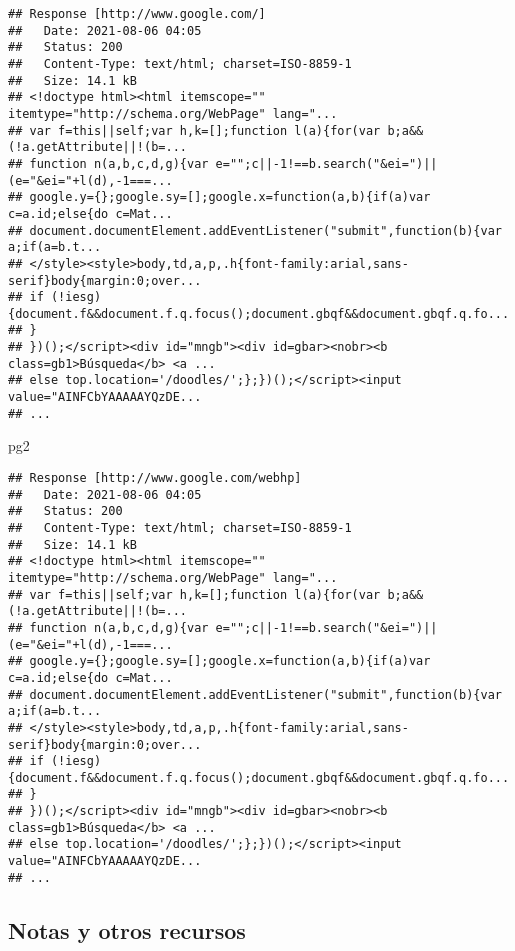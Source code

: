 \documentclass[
]{article}
\newenvironment{Shaded}{\begin{snugshade}}{\end{snugshade}}
\newcommand{\NormalTok}[1]{#1}
\begin{document}
\begin{verbatim}
## Response [http://www.google.com/]
##   Date: 2021-08-06 04:05
##   Status: 200
##   Content-Type: text/html; charset=ISO-8859-1
##   Size: 14.1 kB
## <!doctype html><html itemscope="" itemtype="http://schema.org/WebPage" lang="...
## var f=this||self;var h,k=[];function l(a){for(var b;a&&(!a.getAttribute||!(b=...
## function n(a,b,c,d,g){var e="";c||-1!==b.search("&ei=")||(e="&ei="+l(d),-1===...
## google.y={};google.sy=[];google.x=function(a,b){if(a)var c=a.id;else{do c=Mat...
## document.documentElement.addEventListener("submit",function(b){var a;if(a=b.t...
## </style><style>body,td,a,p,.h{font-family:arial,sans-serif}body{margin:0;over...
## if (!iesg){document.f&&document.f.q.focus();document.gbqf&&document.gbqf.q.fo...
## }
## })();</script><div id="mngb"><div id=gbar><nobr><b class=gb1>Búsqueda</b> <a ...
## else top.location='/doodles/';};})();</script><input value="AINFCbYAAAAAYQzDE...
## ...
\end{verbatim}

\begin{Shaded}
\begin{Highlighting}[]
\NormalTok{pg2}
\end{Highlighting}
\end{Shaded}

\begin{verbatim}
## Response [http://www.google.com/webhp]
##   Date: 2021-08-06 04:05
##   Status: 200
##   Content-Type: text/html; charset=ISO-8859-1
##   Size: 14.1 kB
## <!doctype html><html itemscope="" itemtype="http://schema.org/WebPage" lang="...
## var f=this||self;var h,k=[];function l(a){for(var b;a&&(!a.getAttribute||!(b=...
## function n(a,b,c,d,g){var e="";c||-1!==b.search("&ei=")||(e="&ei="+l(d),-1===...
## google.y={};google.sy=[];google.x=function(a,b){if(a)var c=a.id;else{do c=Mat...
## document.documentElement.addEventListener("submit",function(b){var a;if(a=b.t...
## </style><style>body,td,a,p,.h{font-family:arial,sans-serif}body{margin:0;over...
## if (!iesg){document.f&&document.f.q.focus();document.gbqf&&document.gbqf.q.fo...
## }
## })();</script><div id="mngb"><div id=gbar><nobr><b class=gb1>Búsqueda</b> <a ...
## else top.location='/doodles/';};})();</script><input value="AINFCbYAAAAAYQzDE...
## ...
\end{verbatim}

\hypertarget{notas-y-otros-recursos-1}{%
\subsection{Notas y otros recursos}\label{notas-y-otros-recursos-1}}
\end{document}
